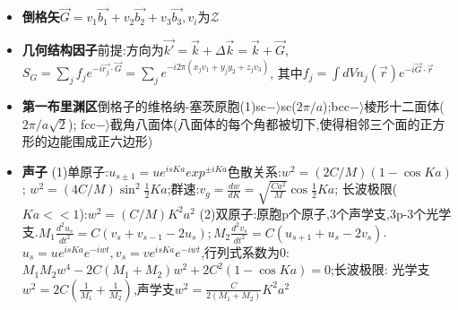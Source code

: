 \documentclass[UTF8,a4paper,1pt]{ctexart}
\begin{document}
\begin{itemize}
  \item \textbf{倒格矢}$\vec{G}=v_1\vec{b_1}+v_2\vec{b_2}+v_3\vec{b_3},v_{i}为\mathcal{Z}$
  \item \textbf{几何结构因子}前提:方向为$\vec{k'}=\vec{k}+\Delta\vec{k}=\vec{k}+\vec{G}$,
  $S_{G}=\sum_{j} f_{j}e^{-i\vec{r_{j}}\cdot\vec{G}}=\sum_{j}e^{-i2\pi(x_j v_1+y_j y_2+z_j v_3)}$,
  其中$f_{j}=\int dVn_{j}(\vec{r})e^{-i\vec{G}\cdot\vec{r}}$
  \item \textbf{第一布里渊区}倒格子的维格纳-塞茨原胞(1)sc$-\rangle$sc($2\pi/a$);bcc$-\rangle$棱形十二面体($2\pi/a\sqrt{2}$);
  fcc$-\rangle$截角八面体(八面体的每个角都被切下,使得相邻三个面的正方形的边能围成正六边形)

  \item \textbf{声子}
  (1)单原子:$u_{s\pm 1}=ue^{isKa}exp^{\pm iKa}$色散关系:$w^2=(2C/M)(1-\cos{Ka})$;
  $w^2=(4C/M)\sin^2{\frac{1}{2}Ka}$;群速:$v_{g}=\frac{dw}{dK}=\sqrt{\frac{Ca^2}{M}}\cos{\frac{1}{2}Ka}$;
  长波极限($Ka<<1$):$w^2=(C/M)K^{2}a^{2}$
  (2)双原子:原胞p个原子,3个声学支,3p-3个光学支.$M_1\frac{d^2 u_s}{dt^2}=C(v_s+v_{s-1}-2u_s);M_2\frac{d^2 v_s}{dt^2}=C(u_{s+1}+u_{s}-2v_s)$.
  $u_s=ue^{isKa}e^{-iwt},v_s=ve^{isKa}e^{-iwt}$,行列式系数为0:$M_1 M_2 w^4-2C(M_1+M_2)w^2+2C^2(1-\cos{Ka})=0$;长波极限:
  光学支$w^2=2C(\frac{1}{M_1}+\frac{1}{M_2})$,声学支$w^2=\frac{C}{2(M_1+M_2)}K^2 a^2$
\end{itemize}

\end{document}
